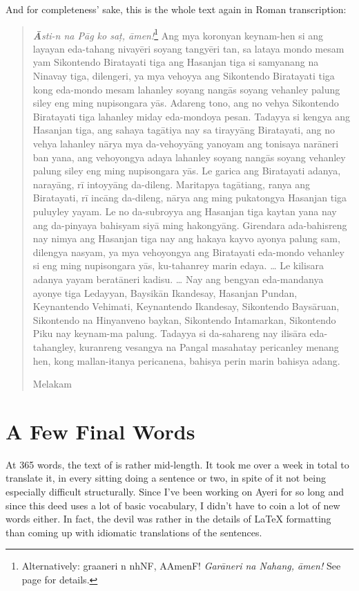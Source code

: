 \documentclass[12pt,paper=a4]{scrartcl}
\newcommand{\fw}[1]{\textit{#1}} %
\newcommand{\ayr}[1]{{\Tagati #1}}
\begin{document}
And for completeness' sake, this is the whole text again in Roman transcription:

\blockquote{
	\fw{\textbf{Ā}sti-n na Pāg ko saț, āmen!}\footnote{Alternatively:
		\ayr{graaneri n nhNF, AAmenF!} \fw{Garāneri na Nahang, āmen!}
		See page \pageref{ex:innomine} for details.} %
	Ang mya koronyan keynam-hen si ang layayan eda-tahang nivayēri soyang 
		tangyēri tan, sa lataya mondo mesam yam Sikontendo Biratayati 
		tiga ang Hasanjan tiga si samyanang na Nina\-vay tiga, 
		dilengeri, ya mya vehoyya ang Sikontendo Biratayati tiga kong 
		eda-mondo mesam lahanley soyang nangās soyang vehanley palung 
		siley eng ming nupisongara yās. %
	Adareng tono, ang no vehya Sikontendo Birata\-yati tiga lahanley miday 
		eda-mondoya pesan. %
	Tadayya si kengya ang Hasanjan tiga, ang sahaya tagātiya nay sa 
		tirayyāng Birata\-yati, ang no vehya lahanley nārya mya 
		da-vehoyyāng yanoyam ang tonisaya narāneri ban yana, ang 
		vehoyongya adaya lahanley soyang nangās soyang vehanley palung 
		siley eng ming nupisongara yās. %
	Le garica ang Biratayati adanya, narayāng, rī intoyyāng da-dileng. %
	Maritapya tagātiang, ranya ang Biratayati, rī incāng da-dileng, 
		nārya ang ming pukatongya Hasanjan tiga puluyley yayam. %
	Le no da-subroyya ang Hasanjan tiga kaytan yana nay ang da-pinyaya 
		bahisyam siyā ming hakongyāng. %
	Girendara ada-bahisreng nay nimya ang Hasanjan tiga nay ang hakaya kayvo 
		ayonya palung sam, dilengya nasyam, ya mya vehoyongya ang 
		Biratayati eda-mondo vehanley si eng ming nupisongara yās, 
		ku-tahanrey marin edaya. %
	… %
	Le kilisara adanya yayam beratāneri kadisu. %
	… %
	Nay ang bengyan eda-mandanya ayonye tiga Ledayyan, Baysikān Ikandesay, 
		Hasanjan Pundan, Keynantendo Vehimati, Keynantendo Ikandesay, 
		Sikontendo Baysāruan, Sikontendo na Hinyanveno baykan, 
		Sikontendo Intamarkan, Sikontendo Piku nay keynam-ma palung. %
	Tadayya si da-sahareng nay ilisāra eda-tahangley, kuranreng vesangya na 
		Pangal masahatay pericanley menang hen, kong mallan-itanya 
		pericanena, bahisya perin marin bahisya adang. %
	\begin{center}
		Melakam
	\end{center}
}

\section{A Few Final Words}
At 365 words, the text of  is rather mid-length. It took 
me over a week in total to translate it, in every sitting doing a sentence or 
two, in spite of it not being especially difficult structurally. Since I've been 
working on Ayeri for so long and since this deed uses a lot of basic vocabulary, 
I didn't have to coin a lot of new words either. In fact, the devil was rather 
in the details of \LaTeX{} formatting than coming up with idiomatic translations 
of the sentences.
\end{document}
